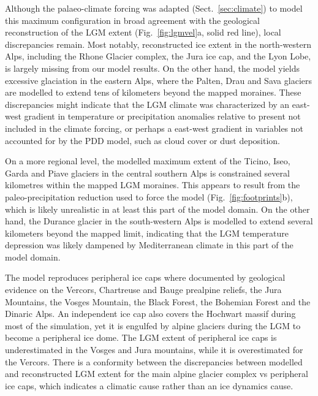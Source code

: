 \documentclass[tc, manuscript]{copernicus}
\begin{document}
    Although the palaeo-climate forcing was adapted (Sect.~\ref{sec:climate})
    to model this maximum configuration in broad agreement with the geological
    reconstruction of the LGM extent (Fig.~\ref{fig:lgmvel}a, solid red line),
    local discrepancies remain. Most notably, reconstructed ice extent in the
    north-western Alps, including the Rhone Glacier complex, the Jura ice cap,
    and the Lyon Lobe, is largely missing from our model results. On the other
    hand, the model yields excessive glaciation in the eastern Alps, where the
    Palten, Drau and Sava glaciers are modelled to extend tens of kilometers
    beyond the mapped moraines. These discrepancies might indicate that the
    LGM climate was characterized by an east-west gradient in temperature or
    precipitation anomalies relative to present not included in the climate
    forcing, or perhaps a east-west gradient in variables not accounted for
    by the PDD model, such as cloud cover or dust deposition.

    On a more regional level, the modelled maximum extent of the Ticino, Iseo,
    Garda and Piave glaciers in the central southern Alps is constrained
    several kilometres within the mapped LGM moraines. This appears to result
    from the paleo-precipitation reduction used to force the model
    (Fig.~\ref{fig:footprints}b), which is likely unrealistic in at least this
    part of the model domain. On the other hand, the Durance glacier in the
    south-western Alps is modelled to extend several kilometers beyond the
    mapped limit, indicating that the LGM temperature depression was likely
    dampened by Mediterranean climate in this part of the model domain.

    The model reproduces peripheral ice caps where documented by geological
    evidence on the Vercors, Chartreuse and Bauge prealpine reliefs,
    the Jura Mountains, the Vosges Mountain, the Black Forest, the Bohemian
    Forest and the Dinaric Alps. An independent ice cap also covers the
    Hochwart massif during most of the simulation, yet it is engulfed by
    alpine glaciers during the LGM to become a peripheral ice dome. The LGM
    extent of peripheral ice caps is underestimated in the Vosges and Jura
    mountains, while it is overestimated for the Vercors. There is a conformity
    between the discrepancies between modelled and reconstructed LGM extent
    for the main alpine glacier complex vs peripheral ice caps, which indicates
    a climatic cause rather than an ice dynamics cause.
\end{document}
